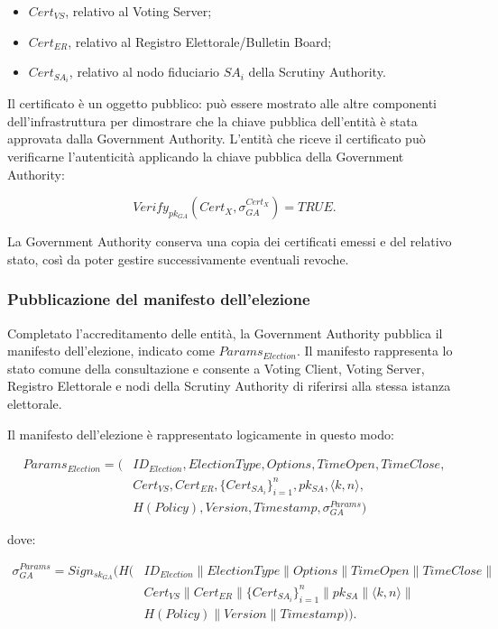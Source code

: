 \documentclass[a4paper,12pt]{article}
\begin{document}
\begin{itemize}
	\item \(Cert_{VS}\), relativo al Voting Server;
	\item \(Cert_{ER}\), relativo al Registro Elettorale/Bulletin Board;
	\item \(Cert_{SA_i}\), relativo al nodo fiduciario \(SA_i\) della Scrutiny Authority.
\end{itemize}

Il certificato \`e un oggetto pubblico: pu\`o essere mostrato alle altre componenti dell'infrastruttura per dimostrare che la chiave pubblica dell'entit\`a \`e stata approvata dalla Government Authority. 
L'entit\`a che riceve il certificato pu\`o verificarne l'autenticit\`a applicando la chiave pubblica della Government Authority:

\[
	Verify_{pk_{GA}}(Cert_X, \sigma_{GA}^{Cert_X}) = TRUE.
\]

La Government Authority conserva una copia dei certificati emessi e del relativo stato, cos\`i da poter gestire successivamente eventuali revoche.

\subsubsection{Pubblicazione del manifesto dell'elezione}

Completato l'accreditamento delle entit\`a, la Government Authority pubblica il manifesto dell'elezione, indicato come \(Params_{Election}\). 
Il manifesto rappresenta lo stato comune della consultazione e consente a Voting Client, Voting Server, Registro Elettorale e nodi della Scrutiny Authority di riferirsi alla stessa istanza elettorale.

Il manifesto dell'elezione è rappresentato logicamente in questo modo:

\[
\begin{aligned}
	Params_{Election} = (&ID_{Election}, ElectionType, Options, TimeOpen, TimeClose,\\
	&Cert_{VS}, Cert_{ER}, \{Cert_{SA_i}\}_{i=1}^{n}, pk_{SA}, \langle k,n\rangle,\\
	&H(Policy), Version, Timestamp, \sigma_{GA}^{Params})
\end{aligned}
\]

dove:

\[
\begin{aligned}
	\sigma_{GA}^{Params} =
	Sign_{sk_{GA}}(H(&ID_{Election} \parallel ElectionType \parallel Options \parallel TimeOpen \parallel TimeClose \parallel\\
	&Cert_{VS} \parallel Cert_{ER} \parallel \{Cert_{SA_i}\}_{i=1}^{n} \parallel pk_{SA} \parallel \langle k,n\rangle \parallel\\
	&H(Policy) \parallel Version \parallel Timestamp)).
\end{aligned}
\]
\end{document}

